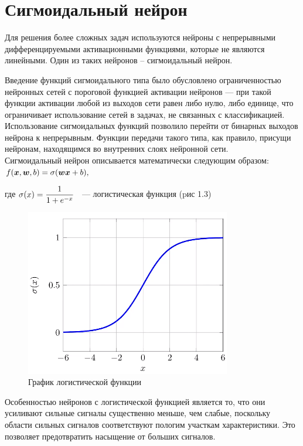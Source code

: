 \section{Сигмоидальный нейрон}

\indent \indent Для решения более сложных задач используются нейроны с непрерывными дифференцируемыми активационными функциями, которые не являются линейными. Один из таких нейронов – сигмоидальный нейрон.

Введение функций сигмоидального типа было обусловлено ограниченностью нейронных сетей с пороговой функцией активации нейронов — при такой функции активации любой из выходов сети равен либо нулю, либо единице, что ограничивает использование сетей в задачах, не связанных с классификацией. Использование сигмоидальных функций позволило перейти от бинарных выходов нейрона к непрерывным. Функции передачи такого типа, как правило, 
присущи нейронам, находящимся во внутренних слоях нейронной сети. \\

Сигмоидальный нейрон описывается математически следующим образом: \\

$
  f( \boldsymbol{x}, \boldsymbol{w}, b) = \sigma(\boldsymbol{wx} + b), \\
$

где $ \mathlarger{\sigma(x) = \frac{1}{1 + e^{-x}}}$ ~--- логистическая функция (pис 1.3)

\begin{figure}[H]
  \centering
  \includegraphics[width=0.5\linewidth]{./img/sigma-func}
  \caption{График логистической функции}
  \label{fig:mpr}
\end{figure} 

Особенностью нейронов с логистической функцией является то, что они усиливают сильные сигналы существенно меньше, чем слабые, поскольку области сильных сигналов соответствуют пологим участкам характеристики. Это позволяет предотвратить насыщение от больших сигналов.

